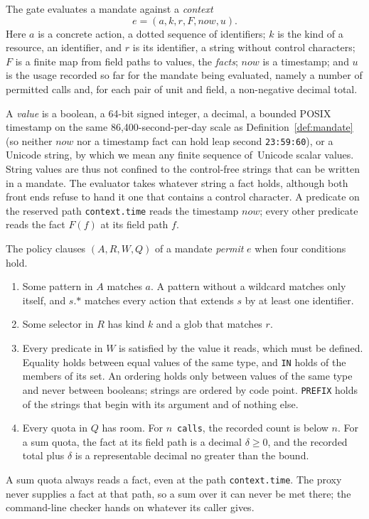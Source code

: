 \documentclass[10pt,twocolumn]{article}
\theoremstyle{plain}
\theoremstyle{definition}
\begin{document}
The gate evaluates a mandate against a \emph{context}
\[
  e = (a, k, r, F, \mathit{now}, u).
\]
Here $a$ is a concrete action, a dotted sequence of identifiers; $k$ is the kind of a resource, an identifier, and $r$ is its identifier, a string without control characters; $F$ is a finite map from field paths to values, the \emph{facts}; $\mathit{now}$ is a timestamp; and $u$ is the usage recorded so far for the mandate being evaluated, namely a number of permitted calls and, for each pair of unit and field, a non-negative decimal total.

A \emph{value} is a boolean, a 64-bit signed integer, a decimal, a bounded POSIX timestamp on the same 86{,}400-second-per-day scale as Definition~\ref{def:mandate} (so neither $\mathit{now}$ nor a timestamp fact can hold leap second \texttt{23:59:60}), or a Unicode string, by which we mean any finite sequence of~Unicode scalar values. String values are thus not confined to the control-free strings that can be written in a mandate. The evaluator takes whatever string a fact holds, although both front ends refuse to hand it one that contains a control character. A predicate on the reserved path \texttt{context.time} reads the timestamp $\mathit{now}$; every other predicate reads the fact $F(f)$ at its field path $f$.

The policy clauses $(A, R, W, Q)$ of a mandate \emph{permit} $e$ when four conditions hold.
\begin{enumerate}[leftmargin=*,itemsep=0pt,topsep=2pt,label=(\roman*)]
  \item Some pattern in $A$ matches $a$. A pattern without a wildcard matches only itself, and $s\texttt{.*}$ matches every action that extends $s$ by at least one identifier.
  \item Some selector in $R$ has kind $k$ and a glob that matches $r$.
  \item Every predicate in $W$ is satisfied by the value it reads, which must be defined. Equality holds between equal values of the same type, and \texttt{IN} holds of the members of its set. An ordering holds only between values of the same type and never between booleans; strings are ordered by code point. \texttt{PREFIX} holds of the strings that begin with its argument and of nothing else.
  \item Every quota in $Q$ has room. For $n$~\texttt{calls}, the recorded count is below $n$. For a sum quota, the fact at its field path is a decimal $\delta \ge 0$, and the recorded total plus $\delta$ is a representable decimal no greater than the bound.
\end{enumerate}
A sum quota always reads a fact, even at the path \texttt{context.time}. The proxy never supplies a fact at that path, so a sum over it can never be met there; the command-line checker hands on whatever its caller gives.
\end{document}
